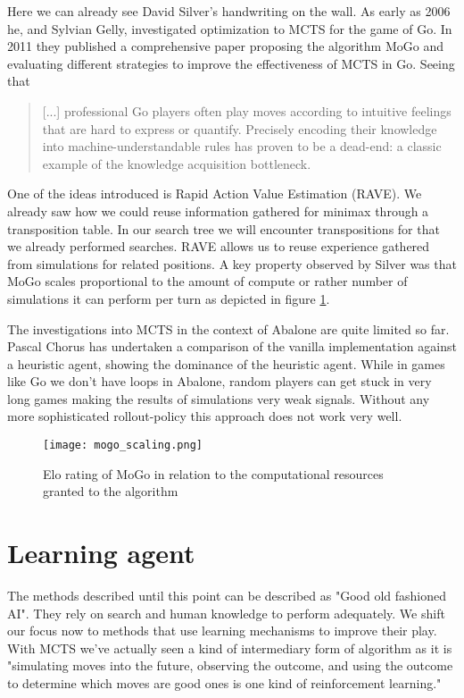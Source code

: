 Here we can already see David Silver's handwriting on the wall. As early as 2006 he, and Sylvian Gelly, investigated optimization to MCTS \cite{gelly_achieving_nodate} for the game of Go. In 2011 they published a comprehensive paper \cite{gelly_monte-carlo_2011} proposing the algorithm MoGo and evaluating different strategies to improve the effectiveness of MCTS in Go. Seeing that

\begin{quotation}
    [...] professional Go players often play moves according to intuitive feelings that are hard to express or quantify. Precisely encoding their knowledge into machine-understandable rules has proven to be a dead-end: a classic example of the knowledge acquisition bottleneck.
\end{quotation}

One of the ideas introduced is Rapid Action Value Estimation (RAVE). We already saw how we could reuse information gathered for minimax through a transposition table. In our search tree we will encounter transpositions for that we already performed searches. RAVE allows us to reuse experience gathered from simulations for related positions. A key property observed by Silver was that MoGo scales proportional to the amount of compute or rather number of simulations it can perform per turn as depicted in figure \ref{mogo_scaling}.

The investigations into MCTS in the context of Abalone are quite limited so far. Pascal Chorus has undertaken a comparison of the vanilla implementation against a heuristic agent, showing the dominance of the heuristic agent. \cite{chorus_implementing_2009} While in games like Go we don't have loops in Abalone, random players can get stuck in very long games making the results of simulations very weak signals. Without any more sophisticated rollout-policy this approach does not work very well.


\begin{figure}
    \centering
    \texttt{[image: mogo\_scaling.png]}
    \caption{Elo rating of MoGo in relation to the computational resources granted to the algorithm \cite{gelly_monte-carlo_2011}}
    \label{mogo_scaling}
\end{figure}

\section{Learning agent}
The methods described until this point can be described as "Good old fashioned AI". They rely on search and human knowledge to perform adequately. We shift our focus now to methods that use learning mechanisms to improve their play. With MCTS we've actually seen a kind of intermediary form of algorithm as it is "simulating moves into the future, observing the outcome, and using the outcome to determine which moves are good ones is one kind of reinforcement learning." \cite{russell_artificial_2021}


